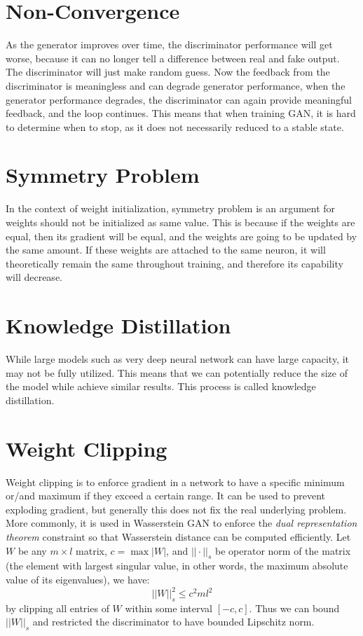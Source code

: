 \section{Non-Convergence}
\label{app:ml:non_conv}
As the generator improves over time, the discriminator performance will get worse, because it can no longer tell a difference between real and fake output. The discriminator will just make random guess. Now the feedback from the discriminator is meaningless and can degrade generator performance, when the generator performance degrades, the discriminator can again provide meaningful feedback, and the loop continues. This means that when training GAN, it is hard to determine when to stop, as it does not necessarily reduced to a stable state.

\section{Symmetry Problem}
\label{app:ml:sym}
In the context of weight initialization, symmetry problem is an argument for weights should not be initialized as same value. This is because if the weights are equal, then its gradient will be equal, and the weights are going to be updated by the same amount. If these weights are attached to the same neuron, it will theoretically remain the same throughout training, and therefore its capability will decrease.

\section{Knowledge Distillation}
\label{app:ml:kd}
While large models such as very deep neural network can have large capacity, it may not be fully utilized. This means that we can potentially reduce the size of the model while achieve similar results. This process is called knowledge distillation.

\section{Weight Clipping}
\label{app:ml:weight_clip}
Weight clipping is to enforce gradient in a network to have a specific minimum or/and maximum if they exceed a certain range. It can be used to prevent exploding gradient, but generally this does not fix the real underlying problem. More commonly, it is used in Wasserstein GAN to enforce the \textit{dual representation theorem} constraint so that Wasserstein distance can be computed efficiently. Let $W$ be any $m\times l$ matrix, $c=\max|W|$, and $||\cdot||_s$ be operator norm of the matrix (the element with largest singular value, in other words, the maximum absolute value of its eigenvalues), we have:
$$
||W||_s^2\leq c^2ml^2
$$
by clipping all entries of $W$ within some interval $[-c, c]$. Thus we can bound $||W||_s$ and restricted the discriminator to have bounded Lipschitz norm.

